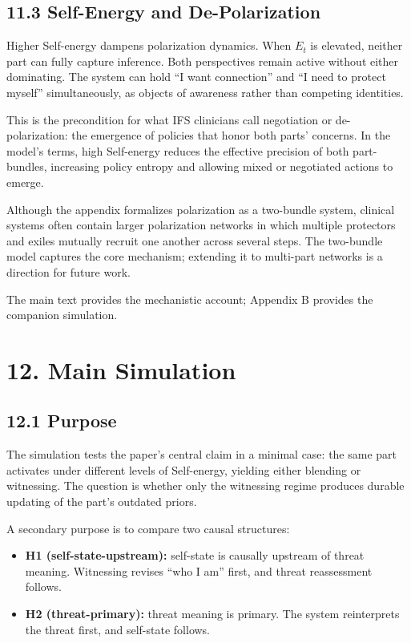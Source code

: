 \documentclass[11pt]{article}
\providecommand{\tightlist}{%
  \setlength{\itemsep}{0pt}\setlength{\parskip}{0pt}}
\begin{document}
\subsection{11.3 Self-Energy and
De-Polarization}\label{self-energy-and-de-polarization}

Higher Self-energy dampens polarization dynamics. When \(E_t\) is
elevated, neither part can fully capture inference. Both perspectives
remain active without either dominating. The system can hold ``I want
connection'' and ``I need to protect myself'' simultaneously, as objects
of awareness rather than competing identities.

This is the precondition for what IFS clinicians call negotiation or
de-polarization: the emergence of policies that honor both parts'
concerns. In the model's terms, high Self-energy reduces the effective
precision of both part-bundles, increasing policy entropy and allowing
mixed or negotiated actions to emerge.

Although the appendix formalizes polarization as a two-bundle system,
clinical systems often contain larger polarization networks in which
multiple protectors and exiles mutually recruit one another across
several steps. The two-bundle model captures the core mechanism;
extending it to multi-part networks is a direction for future work.

The main text provides the mechanistic account; Appendix B provides the
companion simulation.

\section{12. Main Simulation}\label{main-simulation}

\subsection{12.1 Purpose}\label{purpose}

The simulation tests the paper's central claim in a minimal case: the
same part activates under different levels of Self-energy, yielding
either blending or witnessing. The question is whether only the
witnessing regime produces durable updating of the part's outdated
priors.

A secondary purpose is to compare two causal structures:

\begin{itemize}
\tightlist
\item
  \textbf{H1 (self-state-upstream):} self-state is causally upstream of
  threat meaning. Witnessing revises ``who I am'' first, and threat
  reassessment follows.
\item
  \textbf{H2 (threat-primary):} threat meaning is primary. The system
  reinterprets the threat first, and self-state follows.
\end{itemize}
\end{document}
